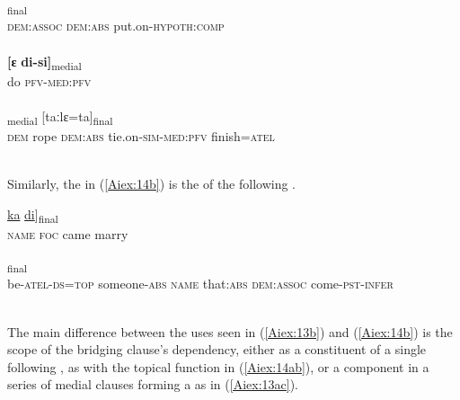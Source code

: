 \documentclass[output=paper]{LSP/langsci}
\begin{document}
\begin{exe}
\ex \label{Aiex:13ac}
\begin{xlist}
\ex \label{Aiex:13a}
\gll \underline{\smash{[aːmi}}	\underline{}	\underline{\smash{bɛː-ɸɛi]}}\textsubscript{final}\\
\textsc{dem:assoc}	\textsc{dem:abs}	put.on-\textsc{hypoth:comp}\\
\glt {}\\
\ex \label{Aiex:13b}
\gll \textbf{[ɛ}	\textbf{di-si]}\textsubscript{medial}\\
	do	\textsc{pfv-med:pfv}\\
\glt {}\\
\ex \label{Aiex:13c}
\textsubscript{medial}	[taːlɛ=ta]\textsubscript{final}\\
	\textsc{dem}	rope	\textsc{dem:abs}	tie.on-\textsc{sim-med:pfv}	finish=\textsc{atel}\\
\glt {}\\
\end{xlist}
\end{exe}

Similarly, the  in (\ref{Aiex:14b}) is the  of the following . 

\begin{exe}
\ex \label{Aiex:14ab}
\begin{xlist}
\ex \label{Aiex:14a}
\gll \underline{\smash{[usaja}}	\underline{ka}	\underline{}	\underline{di}]\textsubscript{final}\\
	\textsc{name}	\textsc{foc}	came	marry\\
\glt	{}\\
\ex \label{Aiex:14b}
\textsubscript{final}\\
	be-\textsc{atel-ds=top}	someone-\textsc{abs}	\textsc{name}	that\textsc{:abs}	\textsc{dem:assoc}	come\textsc{-pst-infer}\\
\glt {}\\
\end{xlist}
\end{exe}

The main difference between the uses seen in (\ref{Aiex:13b}) and (\ref{Aiex:14b}) is the scope of the bridging clause’s dependency, either as a constituent of a single following , as with the topical function in (\ref{Aiex:14ab}), or a component in a series of medial clauses forming a  as in (\ref{Aiex:13ac}).
\end{document}
